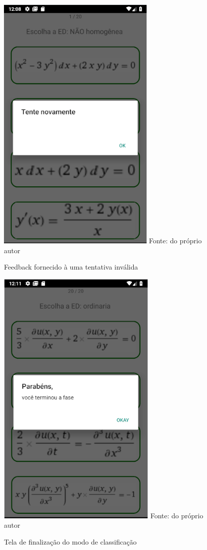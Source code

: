 \begin{figure}[H]
\centering
\caption{Feedback fornecido à uma tentativa inválida}
\includegraphics[scale=0.72]{figuras/tente_novamente.png}
\small{Fonte: do próprio autor}
\end{figure}

\begin{figure}[H]
\centering
\caption{Tela de finalização do modo de classificação}
\includegraphics[scale=0.72]{figuras/fim_fase.png}
\small{Fonte: do próprio autor}
\end{figure}


